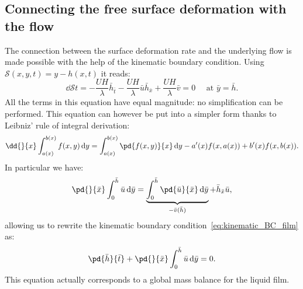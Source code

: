 \subsection{Connecting the free surface deformation with the flow}
The connection between the surface deformation rate and the underlying flow is made possible with the help of the kinematic boundary condition. Using $\mathcal S(x,y,t) = y - h(x,t)$ it reads:
\begin{equation}
\dd{\mathcal S}{t} = -\frac{UH}{\lambda}\bar h_{\bar t} - \frac{UH}{\lambda}\bar u \bar h_{\bar x} + \frac{UH}{\lambda} \bar v = 0 \quad \text{ at } \bar y = \bar h.
\label{eq:kinematic_BC_film}
\end{equation}
All the terms in this equation have equal magnitude: no simplification can be performed. This equation can however be put into a simpler form thanks to Leibniz' rule of integral derivation:
\begin{equation}
\dd{}{x}\int_{a(x)}^{b(x)}f(x,y)\,\mathrm dy = \int_{a(x)}^{b(x)}\pd{f(x,y)}{x}\,\mathrm dy - a'(x) f(x,a(x)) + b'(x) f(x,b(x)).
\end{equation}
In particular we have:
\begin{equation}
\pd{}{\bar x}\int_{0}^{\bar h}\bar u \,\mathrm d\bar y = \underbrace{\int_{0}^{\bar h}\pd{\bar u}{\bar x}\,\mathrm d\bar y}_{-\bar v(\bar h)} + \bar h_{\bar x} \bar u,
\end{equation}
allowing us to rewrite the kinematic boundary condition~\eqref{eq:kinematic_BC_film} as:
\begin{equation}
\pd{\bar h}{\bar t} + \pd{}{\bar x}\int_{0}^{\bar h}\bar u \,\mathrm d\bar y = 0.
\label{eq:mass_conservation_film}
\end{equation}
This equation actually corresponds to a global mass balance for the liquid film.
